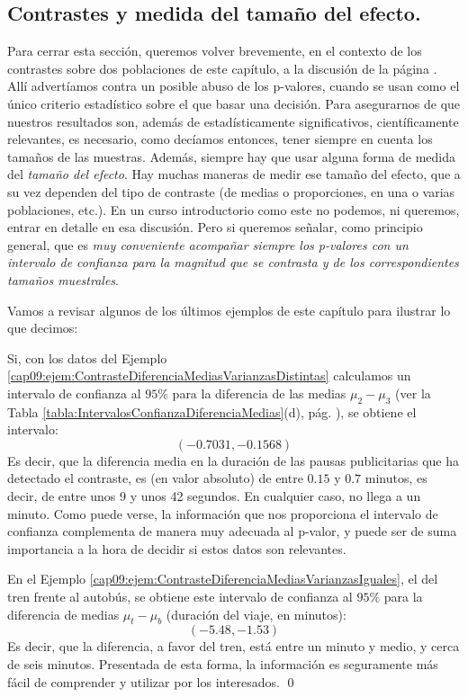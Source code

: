 \subsection{Contrastes y medida del tamaño del efecto.}
\label{cap09:subsec:MedidaTamannoEfecto}

Para cerrar esta sección, queremos volver brevemente, en el contexto de los contrastes sobre dos poblaciones de este capítulo, a la discusión de la página \pageref{cap07:subsubsec:AdvertenciaAbusoPValor}. Allí advertíamos contra un posible abuso de los p-valores, cuando se usan como el único criterio estadístico sobre el que basar una decisión. Para asegurarnos de que nuestros resultados son, además de estadísticamente significativos, científicamente relevantes, es necesario, como decíamos entonces, tener siempre en cuenta los tamaños de las muestras. Además, siempre hay que usar alguna forma de medida del {\em tamaño del efecto}. Hay muchas maneras de medir ese tamaño del efecto, que a su vez dependen del tipo de contraste (de medias o proporciones, en una o varias poblaciones, etc.). En un curso introductorio como este no podemos, ni queremos, entrar en detalle en esa discusión. Pero si queremos señalar, como principio general, que es {\em muy conveniente acompañar siempre los p-valores con un intervalo de confianza para la magnitud que se contrasta y de los correspondientes tamaños muestrales}.

Vamos a revisar algunos de los últimos ejemplos de este capítulo para ilustrar lo que decimos:
\begin{ejemplo}
Si, con los datos del Ejemplo \ref{cap09:ejem:ContrasteDiferenciaMediasVarianzasDistintas} calculamos un intervalo de confianza al $95\%$ para la diferencia de las medias $\mu_2-\mu_3$ (ver la Tabla \ref{tabla:IntervalosConfianzaDiferenciaMedias}(d), pág. \pageref{tabla:IntervalosConfianzaDiferenciaMedias}), se obtiene el intervalo:
\[(-0.7031, -0.1568)\]
Es decir, que la diferencia media en la duración de las pausas publicitarias que ha detectado el contraste, es (en valor absoluto) de entre $0.15$ y $0.7$ minutos, es decir, de entre unos 9 y unos 42 segundos. En cualquier caso, no llega a  un minuto. Como puede verse, la información que nos proporciona el intervalo de confianza complementa de manera muy adecuada al p-valor, y puede ser de suma importancia a la hora de decidir si estos datos son relevantes.

En el Ejemplo \ref{cap09:ejem:ContrasteDiferenciaMediasVarianzasIguales}, el del tren frente al autobús, se obtiene este intervalo de confianza al $95\%$ para la diferencia de medias $\mu_t-\mu_b$ (duración del viaje, en minutos):
\[(-5.48, -1.53)\]
Es decir, que la diferencia, a favor del tren, está entre un minuto y medio, y cerca de seis minutos. Presentada de esta forma, la información es seguramente más fácil de comprender y utilizar por los interesados.
\qed
\end{ejemplo}



